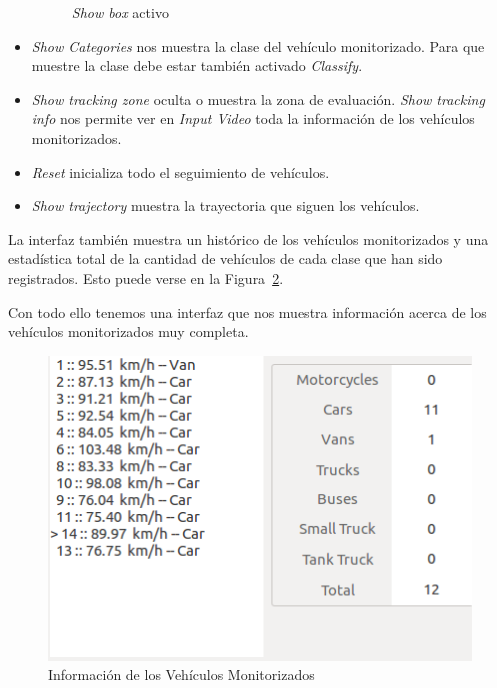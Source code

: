 \begin{itemize}
\begin{figure}[H]
\begin{center}
       \caption{\textit{Show box} activo}
    	\label{fig.show_box}
    \end{center}
    \end{figure}
    \item \textit{Show Categories} nos muestra la clase del vehículo monitorizado. Para que muestre la clase debe estar también activado \textit{Classify}.
    \item \textit{Show tracking zone} oculta o muestra la zona de evaluación.
    \textit{Show tracking info} nos permite ver en \textit{Input Video} toda la información de los vehículos monitorizados.
    \item \textit{Reset} inicializa todo el seguimiento de vehículos.
    \item \textit{Show trajectory} muestra la trayectoria que siguen los vehículos.
\end{itemize}

La interfaz también muestra un histórico de los vehículos monitorizados y una estadística total de la cantidad de vehículos de cada clase que han sido registrados. Esto puede verse en la Figura~\ref{fig.info_vehicles}.

    
Con todo ello tenemos una interfaz que nos muestra información acerca de los vehículos monitorizados muy completa.


    \begin{figure}[H] 
    \begin{center}
    	\includegraphics[scale=0.6]{figures/Diseno_global/info.png}
       \caption{Información de los Vehículos Monitorizados}
    	\label{fig.info_vehicles}
    \end{center}
    \end{figure}
    
